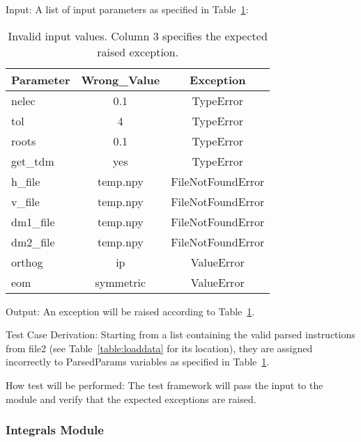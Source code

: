 \documentclass[12pt, titlepage]{article}
\begin{document}
\begin{enumerate}
	Input: A list of input parameters as specified in 
	Table~\ref{table:wrongcases}:
	\begin{table}[h!]
		\centering
		\begin{tabular}{lcc}
			Parameter & Wrong\_Value &     Exception     \\
			\toprule
			nelec      &     0.1      &     TypeError     \\
			tol        &      4       &     TypeError     \\
			roots      &     0.1      &     TypeError     \\
			get\_tdm   &     yes      &     TypeError     \\
			h\_file    &   temp.npy   & FileNotFoundError \\
			v\_file    &   temp.npy   & FileNotFoundError \\
			dm1\_file  &   temp.npy   & FileNotFoundError \\
			dm2\_file  &   temp.npy   & FileNotFoundError \\
			orthog     &      ip      &    ValueError     \\
			eom        &  symmetric   &    ValueError\\
			\bottomrule
		\end{tabular}
		\caption{Invalid input values.  Column 3 
			specifies the expected raised exception.}
		\label{table:wrongcases}
	\end{table}
	
	Output: An exception will be raised according to 
	Table~\ref{table:wrongcases}.
	
	Test Case Derivation: Starting from a list containing the valid parsed 
	instructions from file2 (see Table~\ref{table:loaddata} for its location), 
	they are assigned incorrectly to ParsedParams variables as specified in 
	Table~\ref{table:wrongcases}.
	
	How test will be performed: The test framework will pass the input to 
	the module and verify that the expected exceptions are raised.
	
\end{enumerate}

\subsubsection{Integrals Module}

\end{document}
